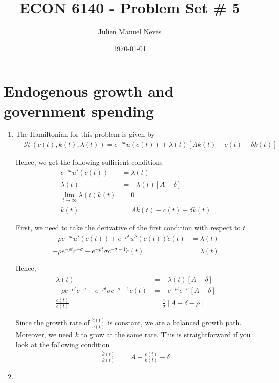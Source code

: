 \documentclass[12pt]{article}
\title{ECON 6140 - Problem Set \# 5}
\date{\today}
\author{Julien Manuel Neves}
\newcommand{\1}{{\bf 1}} %
\begin{document}
\maketitle

\section*{Endogenous growth and government spending}

\begin{enumerate}[(1)]
	\item 
	The Hamiltonian for this problem is given by
	\begin{align*}
&\mathcal{H}(c(t),k(t),\lambda(t)) = e^{-\rho t}u(c(t)) +\lambda(t)[Ak(t)-c(t)-\delta k(t)]
\end{align*}

Hence, we get the following sufficient conditions
\begin{align*}
e^{-\rho t}u'(c(t)) & = \lambda(t)\\
\dot{\lambda}(t) & = -\lambda(t) [A-\delta]\\
\lim_{t\to \infty} \lambda(t) k(t) & = 0\\
	 \dot{k}(t) & =Ak(t)-c(t)-\delta k(t)
\end{align*}

First, we need to take the derivative of the first condition with respect to $t$
\begin{align*}
-\rho e^{-\rho t}u'(c(t)) + e^{-\rho t}u''(c(t))\dot{c}(t) & = \dot{\lambda}(t)\\
-\rho e^{-\rho t}c^{-\sigma}- e^{-\rho t} \sigma c^{-\sigma-1}\dot{c}(t) & = \dot{\lambda}(t)
\end{align*}

Hence,
\begin{align*}
\dot{\lambda}(t) & = -\lambda(t) [A-\delta]\\
-\rho e^{-\rho t}c^{-\sigma}- e^{-\rho t} \sigma c^{-\sigma-1}\dot{c}(t) & = -e^{-\rho t}c^{-\sigma}  [A-\delta]\\
 \frac{\dot{c}(t)}{c(t)} & = \frac{1}{\sigma} [A-\delta-\rho]
\end{align*}

Since the growth rate of $\frac{\dot{c}(t)}{c(t)}$ is constant, we are a balanced growth path. Moreover, we need $k$ to grow at the same rate. This is straightforward if you look at the following condition
\begin{align*}
\frac{\dot{k}(t)}{k(t)} & =A-\frac{c(t)}{k(t)}-\delta
\end{align*}
	\item 
	

\end{enumerate}
\end{document}
